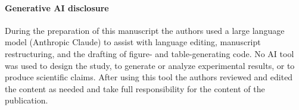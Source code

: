\documentclass[preprint,12pt]{elsarticle}
\begin{document}
\paragraph{Generative AI disclosure}
During the preparation of this manuscript the authors used a large language model
(Anthropic Claude) to assist with language editing, manuscript restructuring, and the
drafting of figure- and table-generating code. No AI tool was used to design the study,
to generate or analyze experimental results, or to produce scientific claims. After
using this tool the authors reviewed and edited the content as needed and take full
responsibility for the content of the publication.



\end{document}
